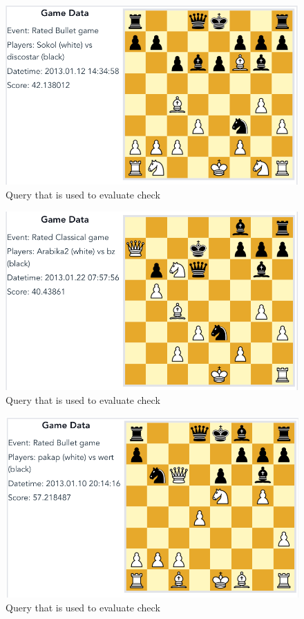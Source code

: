 \documentclass[11pt]{article}
\begin{document}
    \begin{figure}[H]
        \centering
        \includegraphics[width=14cm]{images/BlackCheck1-BoReAtDe}
        \caption{Query that is used to evaluate check}
        \label{fig:BlackCheck1-BoReAtDe}
    \end{figure}

    \begin{figure}[H]
        \centering
        \includegraphics[width=14cm]{images/BlackCheck2-BoReAtDe}
        \caption{Query that is used to evaluate check}
        \label{fig:BlackCheck2-BoReAtDe}
    \end{figure}

    \begin{figure}[H]
        \centering
        \includegraphics[width=14cm]{images/BlackCheck1-BoReAtDeCh}
        \caption{Query that is used to evaluate check}
        \label{fig:BlackCheck1-BoReAtDeCh}
    \end{figure}
\end{document}
